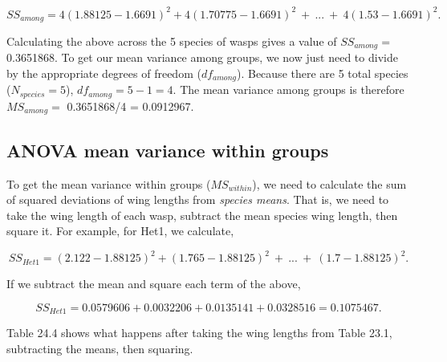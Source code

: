 \documentclass[
  openany]{krantz}
\begin{document}
\[SS_{among} = 4(1.88125 - 1.6691)^{2} + 
               4(1.70775 - 1.6691)^{2}\:+\: ... \:
               +\:4(1.53 - 1.6691)^{2}.\]

Calculating the above across the 5 species of wasps gives a value of \(SS_{among} =\) 0.3651868.
To get our mean variance among groups, we now just need to divide by the appropriate degrees of freedom (\(df_{among}\)).
Because there are 5 total species (\(N_{species} = 5\)), \(df_{among} = 5 - 1 = 4\).
The mean variance among groups is therefore \(MS_{among} =\) 0.3651868/4 = 0.0912967.

\hypertarget{anova-mean-variance-within-groups}{%
\subsection{ANOVA mean variance within groups}\label{anova-mean-variance-within-groups}}

To get the mean variance within groups (\(MS_{within}\)), we need to calculate the sum of squared deviations of wing lengths from \emph{species means}.
That is, we need to take the wing length of each wasp, subtract the mean species wing length, then square it.
For example, for Het1, we calculate,

\[SS_{Het1} = (2.122 - 1.88125)^{2} +
              (1.765 - 1.88125)^{2}
               \:+\: ... \:
               +\: 
              (1.7 - 1.88125)^{2}.\]

If we subtract the mean and square each term of the above,

\[SS_{Het1} = 0.0579606 + 
              0.0032206 +
              0.0135141 +
              0.0328516 = 0.1075467.\]

Table 24.4 shows what happens after taking the wing lengths from Table 23.1, subtracting the means, then squaring.
\end{document}
